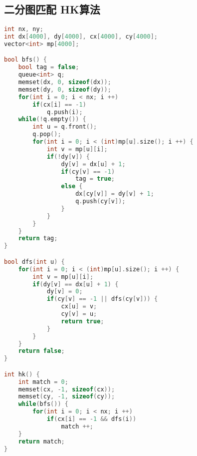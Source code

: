 \subsection{二分图匹配 HK算法}
    \begin{lstlisting}[language=c++]
int nx, ny;
int dx[4000], dy[4000], cx[4000], cy[4000];
vector<int> mp[4000];

bool bfs() {
    bool tag = false;
    queue<int> q;
    memset(dx, 0, sizeof(dx));
    memset(dy, 0, sizeof(dy));
    for(int i = 0; i < nx; i ++)
        if(cx[i] == -1)
            q.push(i);
    while(!q.empty()) {
        int u = q.front();
        q.pop();
        for(int i = 0; i < (int)mp[u].size(); i ++) {
            int v = mp[u][i];
            if(!dy[v]) {
                dy[v] = dx[u] + 1;
                if(cy[v] == -1)
                    tag = true;
                else {
                    dx[cy[v]] = dy[v] + 1;
                    q.push(cy[v]);
                }
            }
        }
    }
    return tag;
}

bool dfs(int u) {
    for(int i = 0; i < (int)mp[u].size(); i ++) {
        int v = mp[u][i];
        if(dy[v] == dx[u] + 1) {
            dy[v] = 0;
            if(cy[v] == -1 || dfs(cy[v])) {
                cx[u] = v;
                cy[v] = u;
                return true;
            }
        }
    }
    return false;
}

int hk() {
    int match = 0;
    memset(cx, -1, sizeof(cx));
    memset(cy, -1, sizeof(cy));
    while(bfs()) {
        for(int i = 0; i < nx; i ++)
            if(cx[i] == -1 && dfs(i))
                match ++;
    }
    return match;
}
    \end{lstlisting}
